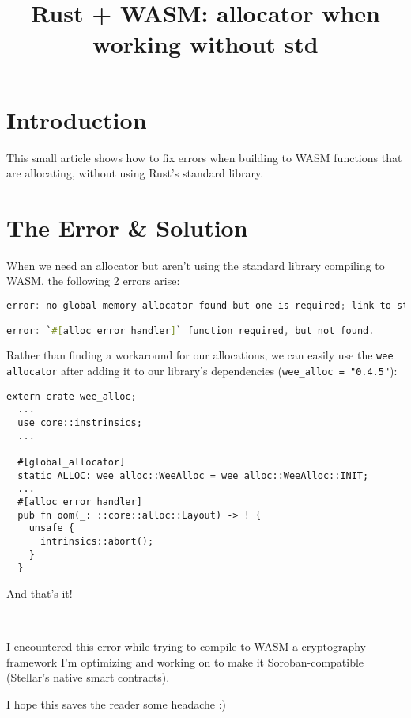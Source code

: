 \documentclass{article}
\title{Rust + WASM: allocator when working without std }
\begin{document}
\maketitle

\section{Introduction}
This small article shows how to fix errors when building to WASM functions that are allocating, without using Rust's standard library.

\section{The Error \& Solution}

When we need an allocator but aren't using the standard library compiling to WASM, the following 2 errors arise:

\begin{lstlisting}[breaklines, language=Rust]
error: no global memory allocator found but one is required; link to std or add `#[global_allocator]` to a static item that implements the GlobalAlloc trait.

error: `#[alloc_error_handler]` function required, but not found.
\end{lstlisting}

Rather than finding a workaround for our allocations, we can easily use the \texttt{wee allocator} after adding it to our library's dependencies (\texttt{wee_alloc = "0.4.5"}):

\begin{lstlisting}[rust]
  extern crate wee_alloc;
  ...
  use core::instrinsics;
  ...
  
  #[global_allocator]
  static ALLOC: wee_alloc::WeeAlloc = wee_alloc::WeeAlloc::INIT;
  ...
  #[alloc_error_handler]
  pub fn oom(_: ::core::alloc::Layout) -> ! {
    unsafe {
      intrinsics::abort();
    }
  }
\end{lstlisting}

And that's it!

\

I encountered this error while trying to compile to WASM a cryptography framework I'm optimizing and working on to make it Soroban-compatible (Stellar's native smart contracts).

I hope this saves the reader some headache :)
\end{document}
